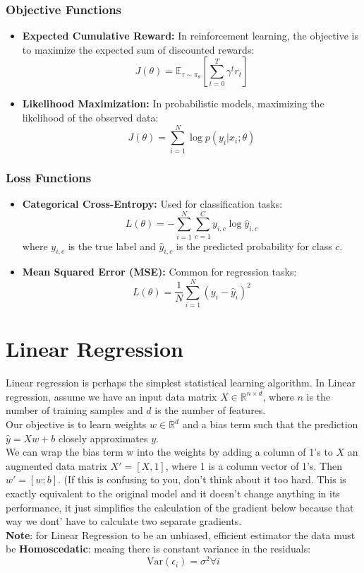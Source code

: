 \documentclass[12pt]{article}
\begin{document}
\subsubsection{Objective Functions}
\begin{itemize}
    \item \textbf{Expected Cumulative Reward:} In reinforcement learning, the objective is to maximize the expected sum of discounted rewards:
    \[
    J(\theta) = \mathbb{E}_{\tau \sim \pi_{\theta}} \left[ \sum_{t=0}^{T} \gamma^t r_t \right]
    \]
    \item \textbf{Likelihood Maximization:} In probabilistic models, maximizing the likelihood of the observed data:
    \[
    J(\theta) = \sum_{i=1}^{N} \log p(y_i | x_i; \theta)
    \]
\end{itemize}

\subsubsection{Loss Functions}
\begin{itemize}
    \item \textbf{Categorical Cross-Entropy:} Used for classification tasks:
    \[
    L(\theta) = -\sum_{i=1}^{N} \sum_{c=1}^{C} y_{i,c} \log \hat{y}_{i,c}
    \]
    where \( y_{i,c} \) is the true label and \( \hat{y}_{i,c} \) is the predicted probability for class \( c \).
    
    \item \textbf{Mean Squared Error (MSE):} Common for regression tasks:
    \[
    L(\theta) = \frac{1}{N} \sum_{i=1}^{N} (y_i - \hat{y}_i)^2
    \]
\end{itemize}

\section{Linear Regression}
Linear regression is perhaps the simplest statistical learning algorithm. In Linear regression, assume we have an input data matrix \(X \in \mathbb{R}^{n \times d}\), where \(n\) is the number of training samples and \(d\) is the number of features.\\

Our objective is to learn weights \(w \in \mathbb{R}^d\)  and a bias term such that the prediction \(\hat{y} = Xw + b\) closely approximates \(y\).\\

We can wrap the bias term w into the weights by adding a column of 1's to \(X\) an augmented data matrix \(X' = [X, 1]\), where 1 is a column vector of 1's. Then \(w' = [w; b]\). (If this is confusing to you, don't think about it too hard. This is exactly equivalent to the original model and it doesn't change anything in its performance, it just simplifies the calculation of the gradient below because that way we dont' have to calculate two separate gradients.\\
\textbf{Note}: for Linear Regression to be an unbiased, efficient estimator the data must be \textbf{Homoscedatic}: meaing there is constant variance in the residuals:
\[\text{Var}(\epsilon_i) = \sigma^2 \forall i\]
\end{document}
